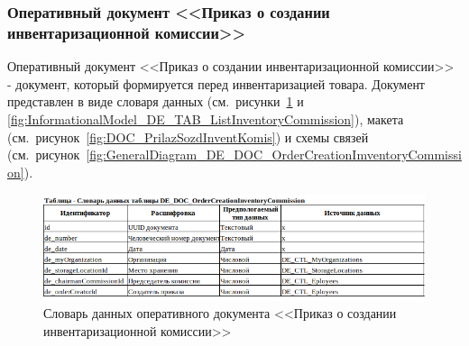 %
%
%
%
%



\newpage
\subsubsection{Оперативный документ <<Приказ о создании инвентаризационной комиссии>>}

Оперативный документ <<Приказ о создании инвентаризационной комиссии>>
- документ, который формируется перед инвентаризацией товара.
Документ представлен в виде словаря данных (см.~рисунки~\ref{fig:InformationalModel_DE_DOC_OrderCreationInventoryCommission} и \ref{fig:InformationalModel_DE_TAB_ListInventoryCommission}),
макета (см.~рисунок~\ref{fig:DOC_PrilazSozdInventKomis})
и схемы связей (см.~рисунок~\ref{fig:GeneralDiagram_DE_DOC_OrderCreationImventoryCommission}).

\begin{figure}[!h]
    \centering
    \includegraphics[width=16cm]
    {assets/InformationalModel/DE_DOC_OrderCreationInventoryCommission.png}
    \caption{Словарь данных оперативного документа <<Приказ о создании инвентаризационной комиссии>>}
    \label{fig:InformationalModel_DE_DOC_OrderCreationInventoryCommission}
\end{figure}

